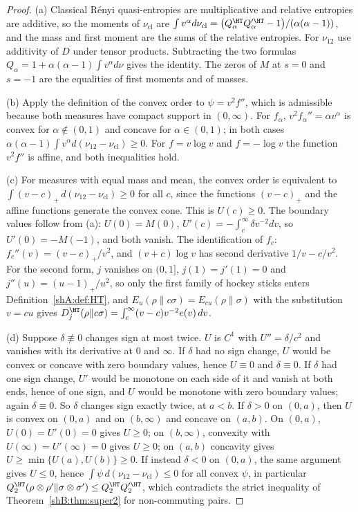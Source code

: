 \begin{proof}
(a) Classical R\'enyi quasi-entropies are multiplicative and relative entropies are additive, so the moments of $\nu_{\mathrm{cl}}$ are $\int v^\alpha d\nu_{\mathrm{cl}}=\big(Q^\HT_\alpha Q'^\HT_\alpha-1\big)/(\alpha(\alpha-1))$, and the mass and first moment are the sums of the relative entropies. For $\nu_{12}$ use additivity of $D$ under tensor products. Subtracting the two formulas $Q_\alpha=1+\alpha(\alpha-1)\int v^\alpha d\nu$ gives the identity. The zeros of $M$ at $s=0$ and $s=-1$ are the equalities of first moments and of masses.

(b) Apply the definition of the convex order to $\psi=v^2f''$, which is admissible because both measures have compact support in $(0,\infty)$. For $f_\alpha$, $v^2f_\alpha''=\alpha v^\alpha$ is convex for $\alpha\notin(0,1)$ and concave for $\alpha\in(0,1)$; in both cases $\alpha(\alpha-1)\int v^\alpha d(\nu_{12}-\nu_{\mathrm{cl}})\ge0$. For $f=v\log v$ and $f=-\log v$ the function $v^2f''$ is affine, and both inequalities hold.

(c) For measures with equal mass and mean, the convex order is equivalent to $\int(v-c)_+\,d(\nu_{12}-\nu_{\mathrm{cl}})\ge0$ for all $c$, since the functions $(v-c)_+$ and the affine functions generate the convex cone. This is $U(c)\ge0$. The boundary values follow from (a): $U(0)=M(0)$, $U'(c)=-\int_c^\infty\delta v^{-2}dv$, so $U'(0)=-M(-1)$, and both vanish. The identification of $f_c$: $f_c''(v)=(v-c)_+/v^2$, and $(v+c)\log v$ has second derivative $1/v-c/v^2$. For the second form, $j$ vanishes on $(0,1]$, $j(1)=j'(1)=0$ and $j''(u)=(u-1)_+/u^2$, so only the first family of hockey sticks enters Definition~\ref{shA:def:HT}, and $E_u(\rho\|c\sigma)=E_{cu}(\rho\|\sigma)$ with the substitution $v=cu$ gives $D^\HT_j(\rho\|c\sigma)=\int_c^\infty(v-c)v^{-2}e(v)\,dv$.

(d) Suppose $\delta\not\equiv0$ changes sign at most twice. $U$ is $C^1$ with $U''=\delta/c^2$ and vanishes with its derivative at $0$ and $\infty$. If $\delta$ had no sign change, $U$ would be convex or concave with zero boundary values, hence $U\equiv0$ and $\delta\equiv0$. If $\delta$ had one sign change, $U'$ would be monotone on each side of it and vanish at both ends, hence of one sign, and $U$ would be monotone with zero boundary values; again $\delta\equiv0$. So $\delta$ changes sign exactly twice, at $a<b$. If $\delta>0$ on $(0,a)$, then $U$ is convex on $(0,a)$ and on $(b,\infty)$ and concave on $(a,b)$. On $(0,a)$, $U(0)=U'(0)=0$ gives $U\ge0$; on $(b,\infty)$, convexity with $U(\infty)=U'(\infty)=0$ gives $U\ge0$; on $(a,b)$ concavity gives $U\ge\min\{U(a),U(b)\}\ge0$. If instead $\delta<0$ on $(0,a)$, the same argument gives $U\le0$, hence $\int\psi\,d(\nu_{12}-\nu_{\mathrm{cl}})\le0$ for all convex $\psi$, in particular $Q^\HT_2(\rho\otimes\rho'\|\sigma\otimes\sigma')\le Q^\HT_2Q'^\HT_2$, which contradicts the strict inequality of Theorem~\ref{shB:thm:super2} for non-commuting pairs.
\end{proof}

